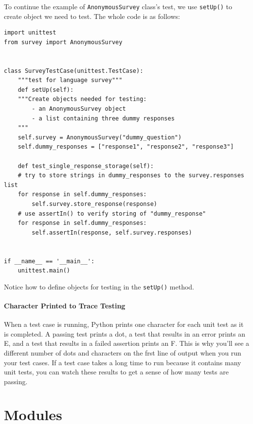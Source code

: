 \documentclass[12pt]{book}
\begin{document}
To continue the example of \texttt{AnonymousSurvey} class's test, we use \texttt{setUp()} to create object we need to test. The whole code is as follows:
\begin{verbatim}
import unittest
from survey import AnonymousSurvey


class SurveyTestCase(unittest.TestCase):
    """test for language survey"""
    def setUp(self):
	"""Create objects needed for testing:
	    - an AnonymousSurvey object
	    - a list containing three dummy responses
	"""
	self.survey = AnonymousSurvey("dummy_question")
	self.dummy_responses = ["response1", "response2", "response3"]

    def test_single_response_storage(self):
	# try to store strings in dummy_responses to the survey.responses list
	for response in self.dummy_responses:
	    self.survey.store_response(response)
	# use assertIn() to verify storing of "dummy_response"
	for response in self.dummy_responses:
	    self.assertIn(response, self.survey.responses)


if __name__ == '__main__':
    unittest.main()

\end{verbatim}
Notice how to define objects for testing in the \texttt{setUp()} method.

\subsection{Character Printed to Trace Testing}
\label{sec:org9e83d2a}
When a test case is running, Python prints one character for each unit test as it is completed. A passing test prints a dot, a test that results in an error prints an E, and a test that results in a failed assertion prints an F. This is why you’ll see a different number of dots and characters on the frst line of output when you run your test cases. If a test case takes a long time to run because it contains many unit tests, you can watch these results to get a sense of how many tests are passing.

\part{Modules}
\label{sec:org9547f4a}
\end{document}
